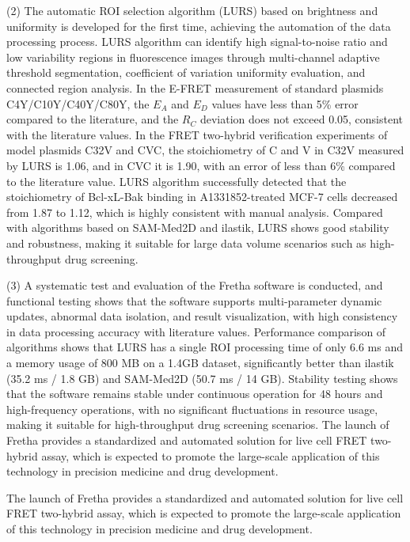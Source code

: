 \begin{eabstract}
(2) The automatic ROI selection algorithm (LURS) based on brightness and uniformity is developed for the first time, achieving the automation of the data processing process.
LURS algorithm can identify high signal-to-noise ratio and low variability regions in fluorescence images through multi-channel adaptive threshold segmentation, coefficient of variation uniformity evaluation, and connected region analysis.
In the E-FRET measurement of standard plasmids C4Y/C10Y/C40Y/C80Y, the $E_{A}$ and $E_{D}$ values have less than 5\% error compared to the literature, and the $R_{C}$ deviation does not exceed 0.05, consistent with the literature values.
In the FRET two-hybrid verification experiments of model plasmids C32V and CVC, the stoichiometry of C and V in C32V measured by LURS is 1.06, and in CVC it is 1.90, with an error of less than 6\% compared to the literature value.
LURS algorithm successfully detected that the stoichiometry of Bcl-xL-Bak binding in A1331852-treated MCF-7 cells decreased from 1.87 to 1.12, which is highly consistent with manual analysis.
Compared with algorithms based on SAM-Med2D and ilastik, LURS shows good stability and robustness, making it suitable for large data volume scenarios such as high-throughput drug screening.

(3) A systematic test and evaluation of the Fretha software is conducted, and functional testing shows that the software supports multi-parameter dynamic updates, abnormal data isolation, and result visualization, with high consistency in data processing accuracy with literature values. Performance comparison of algorithms shows that LURS has a single ROI processing time of only 6.6 ms and a memory usage of 800 MB on a 1.4GB dataset, significantly better than ilastik (35.2 ms / 1.8 GB) and SAM-Med2D (50.7 ms / 14 GB). Stability testing shows that the software remains stable under continuous operation for 48 hours and high-frequency operations, with no significant fluctuations in resource usage, making it suitable for high-throughput drug screening scenarios.
The launch of Fretha provides a standardized and automated solution for live cell FRET two-hybrid assay, which is expected to promote the large-scale application of this technology in precision medicine and drug development.

The launch of Fretha provides a standardized and automated solution for live cell FRET two-hybrid assay, which is expected to promote the large-scale application of this technology in precision medicine and drug development.

\end{eabstract}


